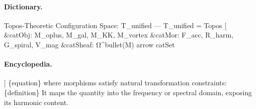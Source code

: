 \paragraph{Dictionary.}
Topos-Theoretic Configuration Space: T\_unified — T\_unified = Topos [ \&catObj: M\_oplus, M\_gal, M\_KK, M\_vortex \&catMor: F\_acc, R\_harm, G\_spiral, V\_mag \&catSheaf: Ω\textasciicircum{}bullet(M) arrow catSet

\paragraph{Encyclopedia.}
] \{equation\} where morphisms satisfy natural transformation constraints: \{definition\} It maps the quantity into the frequency or spectral domain, exposing its harmonic content.
